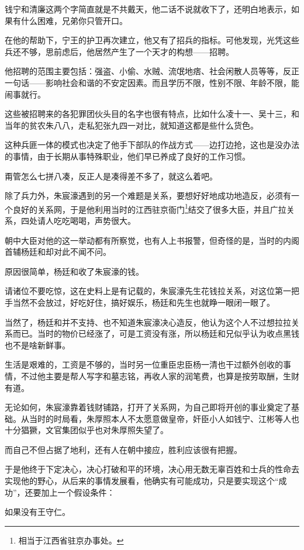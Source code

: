 \begin{multicols}{\theparacolNo}
钱宁和清廉这两个字简直就是不共戴天，他二话不说就收下了，还明白地表示，如果有什么困难，兄弟你只管开口。

在他的帮助下，宁王的护卫再次建立，他又有了招兵的指标。可他发现，光凭这些兵还不够，思前虑后，他居然产生了一个天才的构想——招聘。

他招聘的范围主要包括：强盗、小偷、水贼、流氓地痞、社会闲散人员等等，反正一句话——影响社会和谐的不安定因素。而且学历不限，性别不限、年龄不限，能闹事就行。

这些被招聘来的各犯罪团伙头目的名字也很有特点，比如什么凌十一、吴十三，和当年的贫农朱八八，走私犯张九四一对比，就知道这都是些什么货色。

这种兵匪一体的模式也决定了他手下部队的作战方式——边打边抢，这也是没办法的事情，由于长期从事特殊职业，他们早已养成了良好的工作习惯。

甭管怎么七拼八凑，反正人是凑得差不多了，就这么着吧。

除了兵力外，朱宸濠遇到的另一个难题是关系，要想好好地成功地造反，必须有一个良好的关系网，于是他利用当时的江西驻京衙门\footnote{相当于江西省驻京办事处。}结交了很多大臣，并且广拉关系，四处请人吃吃喝喝，声势很大。

朝中大臣对他的这一举动都有所察觉，也有人上书报警，但奇怪的是，当时的内阁首辅杨廷和却对此不闻不问。

原因很简单，杨廷和收了朱宸濠的钱。

请诸位不要吃惊，这在史料上是有记载的，朱宸濠先生花钱拉关系，对这位第一把手当然不会放过，好吃好住，搞好娱乐，杨廷和先生也就睁一眼闭一眼了。

当然了，杨廷和并不支持、也不知道朱宸濠决心造反，他认为这个人不过想拉拉关系而已。当时的物价已经涨了，可是工资没有涨，所以杨廷和兄似乎认为收点黑钱也不是啥新鲜事。

生活是艰难的，工资是不够的，当时另一位重臣忠臣杨一清也干过额外创收的事情，不过他主要是帮人写字和墓志铭，再收人家的润笔费，也算是按劳取酬，生财有道。

无论如何，朱宸濠靠着钱财铺路，打开了关系网，为自己即将开创的事业奠定了基础。从当时的时局看，朱厚照本人不太愿意做皇帝，奸臣小人如钱宁、江彬等人也十分猖獗，文官集团似乎也对朱厚照失望了。

而自己不但占据了地利，还有人在朝中接应，胜利应该很有把握。

于是他终于下定决心，决心打破和平的环境，决心用无数无辜百姓和士兵的性命去实现他的野心，从后来的事情发展看，他确实有可能成功，只是要实现这个“成功”，还要加上一个假设条件：

如果没有王守仁。
\ifnum{}
	\end{multicols}
\fi
\newpage
